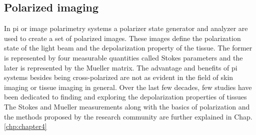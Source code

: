 \subsection{Polarized imaging}
In \acf{pi} or image polarimetry systems a polarizer state generator and analyzer are used to create a set of polarized images. 
These images define the polarization state of the light beam and the depolarization property of the tissue.
The former is represented by four measurable quantities called Stokes parameters and the later is represented by the Mueller matrix. 
The advantage and benefits of \ac{pi} systems besides being cross-polarized are not as evident in the field of skin imaging or tissue imaging in general.
Over the last few decades, few studies have been dedicated to finding and exploring the depolarization properties of tissues~\cite{Anastasiadou2008,manhas2009polarized,manhas2009polarized,Jacques12175282}
The Stokes and Mueller measurements along with the basics of polarization and the methods proposed by the research community are further explained in Chap.\,\ref{chp:chapter4}




